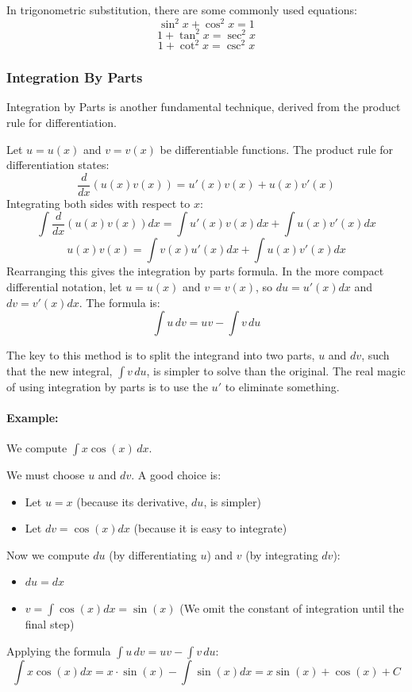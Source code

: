 \begin{remark}
In trigonometric substitution, there are some commonly used equations:
\[\sin^2 x + \cos ^2 x = 1\]
\[1 + \tan^2 x = \sec^2 x\]
\[1 + \cot^2 x = \csc^2 x\]
\end{remark}

\subsubsection{Integration By Parts}
Integration by Parts is another fundamental technique, derived from the product rule for differentiation.

\begin{definition}
Let $u = u(x)$ and $v = v(x)$ be differentiable functions. The product rule for differentiation states:
\[
\frac{d}{dx}(u(x)v(x)) = u'(x)v(x) + u(x)v'(x)
\]
Integrating both sides with respect to $x$:
\[
\int \frac{d}{dx}(u(x)v(x)) dx = \int u'(x)v(x) dx + \int u(x)v'(x) dx
\]
\[
u(x)v(x) = \int v(x) u'(x) dx + \int u(x) v'(x) dx
\]
Rearranging this gives the integration by parts formula. In the more compact differential notation, let $u = u(x)$ and $v = v(x)$, so $du = u'(x)dx$ and $dv = v'(x)dx$. The formula is:
\[
\int u \, dv = uv - \int v \, du
\]
\end{definition}

The key to this method is to split the integrand into two parts, $u$ and $dv$, such that the new integral, $\int v \, du$, is simpler to solve than the original. The real magic of using integration by parts is to use the $u'$ to eliminate something.

\paragraph*{Example:}
We compute $\int x \cos(x)\,dx$.

We must choose $u$ and $dv$. A good choice is:
\begin{itemize}
    \item Let $u = x$ (because its derivative, $du$, is simpler)
    \item Let $dv = \cos(x) dx$ (because it is easy to integrate)
\end{itemize}
Now we compute $du$ (by differentiating $u$) and $v$ (by integrating $dv$):
\begin{itemize}
    \item $du = dx$
    \item $v = \int \cos(x) dx = \sin(x)$ (We omit the constant of integration until the final step)
\end{itemize}
Applying the formula $\int u \, dv = uv - \int v \, du$:
\[
\int x \cos(x) dx = x \cdot \sin(x) - \int \sin(x) dx = x\sin(x) + \cos(x) + C
\]

